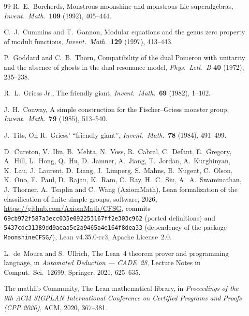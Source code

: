 \documentclass[10pt]{article}
\begin{document}
\begin{thebibliography}{99}
  R.~E.~Borcherds, Monstrous moonshine and monstrous Lie superalgebras, \emph{Invent.\ Math.}\ \textbf{109} (1992),
  405--444.

  C.~J.~Cummins and T.~Gannon, Modular equations and the genus zero property of moduli functions, \emph{Invent.\
  Math.}\ \textbf{129} (1997), 413--443.

  P.~Goddard and C.~B.~Thorn, Compatibility of the dual Pomeron with unitarity and the absence of ghosts in the dual
  resonance model, \emph{Phys.\ Lett.\ B} \textbf{40} (1972), 235--238.

  R.~L.~Griess Jr., The friendly giant, \emph{Invent.\ Math.}\ \textbf{69} (1982), 1--102.

  J.~H.~Conway, A simple construction for the Fischer--Griess monster group, \emph{Invent.\ Math.}\ \textbf{79}
  (1985), 513--540.

  J.~Tits, On R.~Griess' ``friendly giant'', \emph{Invent.\ Math.}\ \textbf{78} (1984), 491--499.

  D.~Cureton, V.~Ilin, B.~Mehta, N.~Voss, R.~Cabral, C.~Defant, E.~Gregory, A.~Hill, L.~Hong, Q.~Hu, D.~Jamner,
  A.~Jiang, T.~Jordan, A.~Kurghinyan, K.~Lau, J.~Laurent, D.~Liang, J.~Limperg, S.~Mahns, B.~Nugent, C.~Olson, K.~Ono,
  E.~Paul, D.~Rajan, K.~Ram, C.~Ray, H.~C.~Siu, A.~A.~Swaminathan, J.~Thorner, A.~Tsaplin and C.~Wang (AxiomMath),
  Lean formalization of the classification of finite simple groups, software, 2026,
  \url{https://github.com/AxiomMath/CFSG}, commits \texttt{69cb972f587a3ecc035e092253167ff2e303c962} (ported
  definitions) and \texttt{5437cdc31389dd9aeaa5c2a9465a4e164f8dea33} (dependency of the package \texttt{MoonshineCFSG/}), Lean
  v4.35.0-rc3, Apache License~2.0.

  L.~de~Moura and S.~Ullrich, The Lean~4 theorem prover and programming language, in \emph{Automated Deduction ---
  CADE~28}, Lecture Notes in Comput.\ Sci.~12699, Springer, 2021, 625--635.

  The mathlib Community, The Lean mathematical library, in \emph{Proceedings of the 9th ACM SIGPLAN International
  Conference on Certified Programs and Proofs (CPP 2020)}, ACM, 2020, 367--381.

\end{thebibliography}
\end{document}
